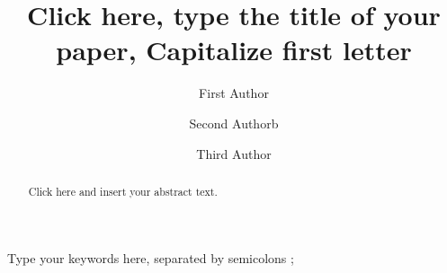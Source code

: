\documentclass[3p,times,procedia]{elsarticle}
\begin{document}
\begin{frontmatter}




\title{Click here, type the title of your paper, Capitalize first letter}


\author[a]{First Author} 
\author[b]{Second Authorb}
\author[a,b]{Third Author}

\address[a]{First affiliation, Address, City and Postcode, Country}
\address[b]{Second affiliation, Address, City and Postcode, Country}

\begin{abstract}
Click here and insert your abstract text.\vskip11pt
\end{abstract}

\begin{keyword}
Type your keywords here, separated by semicolons ; 




\end{keyword}
\end{frontmatter}
\end{document}

